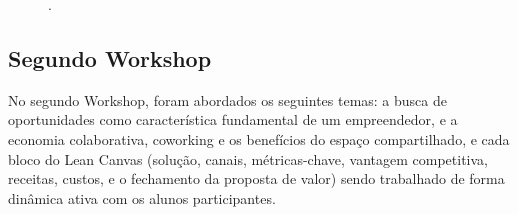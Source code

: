 \begin{figure}[H]
\qquad
{}
.
\label{figura_29}
\end{figure}

\subsection{Segundo Workshop}

No segundo Workshop, foram abordados os seguintes temas: a busca de oportunidades como característica fundamental de um empreendedor, e a economia colaborativa, coworking e os benefícios do espaço compartilhado, e cada bloco do Lean Canvas (solução, canais, métricas-chave, vantagem competitiva, receitas, custos, e o fechamento da proposta de valor) sendo trabalhado de forma dinâmica ativa com os alunos participantes. 


